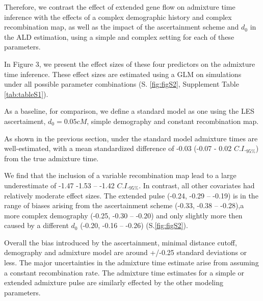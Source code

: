 \documentclass[]{article}
\begin{document}
Therefore, we contrast the effect of extended gene flow on admixture time inference with  the effects of a complex demographic history and complex recombination map, as well as the impact of the ascertainment scheme and $d_0$ in the ALD estimation, using a simple and complex setting for each of these parameters. 

In Figure 3, we present the effect sizes of these four predictors on the admixture time inference. These effect sizes are estimated using a GLM on simulations under all possible parameter combinations  (S. \ref{fig:figS2}, Supplement Table \ref{tab:tableS1}).

As a baseline, for comparison, we define a standard model as one using the LES ascertaiment, \(d_{0} = 0.05 cM\), simple demography and constant recombination map. 

As shown in the previous section, under the standard model admixture times are well-estimated, with a mean standardized difference of  -0.03 (-0.07 - 0.02 $C.I._{95\%}$) from the true
admixture time.

We find that the  inclusion of a variable recombination map lead to a large underestimate of -1.47 -1.53 -- -1.42 $C.I._{95\%}$. In contrast, all other covariates had relatively moderate effect sizes. The extended pulse   (-0.24,  -0.29 -- -0.19) is in the range of biases arising from the ascertainment scheme (-0.33, -0.38 --
-0.28),a more complex demography (-0.25, -0.30 -- -0.20) and only slightly more then caused by a different $d_0$ (-0.20, -0.16 --
-0.26) (S.\ref{fig:figS2}).

Overall the bias introduced by the ascertainment, minimal distance
cutoff, demography and admixture model are  around +/-0.25 standard deviations or less. The major uncertainties in the admixture time
estimate arise from assuming a constant recombination rate. The
admixture time estimates for a simple or extended admixture pulse are similarly effected by the other modeling parameters.
\end{document}
